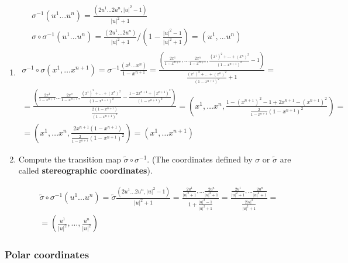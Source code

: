 \begin{enumerate}
\item[b]
\[
\begin{gathered}
\begin{aligned}
	& \sigma^{-1} (u^1 \dots u^n) = \frac{(2u^1 \dots 2u^n, |u|^2 - 1) }{ |u|^2 + 1 } \\
	& \sigma \circ \sigma^{-1}(u^1 \dots u^n) = \frac{ (2u^1 \dots 2u^n) }{ |u|^2 + 1 } / \left( 1 - \frac{ |u|^2 - 1 }{ |u|^2 + 1 } \right) = (u^1, \dots u^n)
\end{aligned}	\\
\sigma^{-1} \circ \sigma(x^1, \dots x^{n+1}) = \sigma^{-1} \frac{ (x^1 \dots x^n) }{ 1 - x^{n+1} } = \frac{ \left(\frac{ 2 x^1}{ 1 - x^{n+1} } , \dots \frac{2x^n}{1 - x^{n+1} } , \frac{ (x^1)^2 + \dots + (x^n)^2 }{ ( 1- x^{n+1})^2 } - 1 \right) }{ \frac{ (x^1)^2 + \dots + (x^n)^2}{ (1- x^{n+1})^2 } + 1 } = \\
= \frac{ \left( \frac{ 2 x^1}{ 1 - x^{n+1}} \dots \frac{2x^n}{1- x^{n+1}} , \frac{ (x^1)^2 + \dots + (x^n)^2 }{ (1-x^{n+1})^2} - \frac{ 1 - 2x^{n+1} + (x^{n+1})^2 }{ (1- x^{n+1})^2} \right) }{ \frac{2(1-x^{n+1})}{(1-x^{n+1})^2} } = \left( x^1, \dots x^n , \frac{ 1 - (x^{n+1})^2 - 1 + 2x^{n+1} - (x^{n+1})^2 }{ \frac{ 2 }{ 1 - x^{n+1}} (1- x^{n+1})^2 } \right) = \\
= (x^1, \dots x^n , \frac{2 x^{n+1} ( 1 -x^{n+1}) }{ \frac{ 2 }{ 1 - x^{n+1}} ( 1 - x^{n+1})^2 } ) = (x^1, \dots x^{n+1})
\end{gathered}
\]
\item[(c)] Compute the transition map $\widetilde{\sigma} \circ \sigma^{-1}$. (The coordinates defined by $\sigma$ or $\widetilde{\sigma}$ are called \textbf{stereographic coordinates}).

\[
\begin{gathered}
	\widetilde{\sigma} \circ \sigma^{-1}(u^1 \dots u^n) = \widetilde{\sigma} \frac{(2u^1 \dots 2u^n, |u|^2-1) }{ |u|^2 +  1} = \frac{ \frac{2u^1}{ |u|^2 + 1} , \dots \frac{2u^n}{ |u|^2 + 1} }{ 1 + \frac{ |u|^2 - 1 }{ |u|^2 + 1} } = \frac{ \frac{2u^1}{ |u|^2 + 1} , \dots \frac{2u^n}{ |u|^2 + 1} }{  \frac{2|u|^2}{ |u|^2 + 1} } = \\
	= \boxed{ \left( \frac{u^1}{ |u|^2} , \dots , \frac{u^n}{ |u|^2} \right) }
\end{gathered}
\]

\end{enumerate}

\subsubsection{Polar coordinates}

